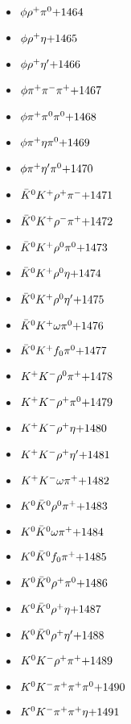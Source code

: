 \begin{multicols}{3}
\begin{itemize}
 \item $ \phi \rho^{+} \pi^{0} \hfill{+1464}$
 \item $ \phi \rho^{+} \eta \hfill{+1465}$
 \item $ \phi \rho^{+} {\eta^{\prime}} \hfill{+1466}$
 \item $ \phi \pi^{+} \pi^{-} \pi^{+} \hfill{+1467}$
 \item $ \phi \pi^{+} \pi^{0} \pi^{0} \hfill{+1468}$
 \item $ \phi \pi^{+} \eta \pi^{0} \hfill{+1469}$
 \item $ \phi \pi^{+} {\eta^{\prime}} \pi^{0} \hfill{+1470}$
 \item $ \bar{K}^{0} K^{+} \rho^{+} \pi^{-} \hfill{+1471}$
 \item $ \bar{K}^{0} K^{+} \rho^{-} \pi^{+} \hfill{+1472}$
 \item $ \bar{K}^{0} K^{+} \rho^{0} \pi^{0} \hfill{+1473}$
 \item $ \bar{K}^{0} K^{+} \rho^{0} \eta \hfill{+1474}$
 \item $ \bar{K}^{0} K^{+} \rho^{0} {\eta^{\prime}} \hfill{+1475}$
 \item $ \bar{K}^{0} K^{+} \omega \pi^{0} \hfill{+1476}$
 \item $ \bar{K}^{0} K^{+} f_{0} \pi^{0} \hfill{+1477}$
 \item $ K^{+} K^{-} \rho^{0} \pi^{+} \hfill{+1478}$
 \item $ K^{+} K^{-} \rho^{+} \pi^{0} \hfill{+1479}$
 \item $ K^{+} K^{-} \rho^{+} \eta \hfill{+1480}$
 \item $ K^{+} K^{-} \rho^{+} {\eta^{\prime}} \hfill{+1481}$
 \item $ K^{+} K^{-} \omega \pi^{+} \hfill{+1482}$
 \item $ K^{0} \bar{K}^{0} \rho^{0} \pi^{+} \hfill{+1483}$
 \item $ K^{0} \bar{K}^{0} \omega \pi^{+} \hfill{+1484}$
 \item $ K^{0} \bar{K}^{0} f_{0} \pi^{+} \hfill{+1485}$
 \item $ K^{0} \bar{K}^{0} \rho^{+} \pi^{0} \hfill{+1486}$
 \item $ K^{0} \bar{K}^{0} \rho^{+} \eta \hfill{+1487}$
 \item $ K^{0} \bar{K}^{0} \rho^{+} {\eta^{\prime}} \hfill{+1488}$
 \item $ K^{0} K^{-} \rho^{+} \pi^{+} \hfill{+1489}$
 \item $ K^{0} K^{-} \pi^{+} \pi^{+} \pi^{0} \hfill{+1490}$
 \item $ K^{0} K^{-} \pi^{+} \pi^{+} \eta \hfill{+1491}$

\end{itemize}
\end{multicols}
